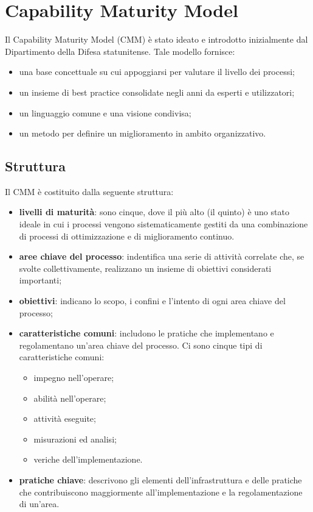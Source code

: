 \documentclass[PianoDiQualifica.tex]{subfiles}
\begin{document}
\section{Capability Maturity Model}
	Il Capability Maturity Model (CMM) è stato ideato e introdotto inizialmente dal Dipartimento della Difesa statunitense. Tale modello
	fornisce:
	\begin{itemize}
		\item una base concettuale su cui appoggiarsi per valutare il livello dei processi;
		\item un insieme di best practice consolidate negli anni da esperti e utilizzatori;
		\item un linguaggio comune e una visione condivisa;
		\item un metodo per definire un miglioramento in ambito organizzativo.
	\end{itemize}
	\subsection{Struttura}
	Il CMM è costituito dalla seguente struttura:
	\begin{itemize}
		\item \textbf{livelli di maturità}: sono cinque, dove il più alto (il quinto) è uno stato ideale in cui i processi vengono sistematicamente
		gestiti da una combinazione di processi di ottimizzazione e di miglioramento continuo. 
		\item \textbf{aree chiave del processo}: indentifica una serie di attività correlate che, se svolte collettivamente,
		realizzano un insieme di obiettivi considerati importanti;
		\item \textbf{obiettivi}: indicano lo scopo, i confini e l'intento di ogni area chiave del processo;
		\item \textbf{caratteristiche comuni}: includono le pratiche che implementano e regolamentano un'area chiave del processo. Ci sono cinque
		tipi di caratteristiche comuni:
		\begin{itemize}
			\item impegno nell'operare;
			\item abilità nell'operare;
			\item attività eseguite;
			\item misurazioni ed analisi;
			\item veriche dell'implementazione.
		\end{itemize}
		\item \textbf{pratiche chiave}: descrivono gli elementi dell'infrastruttura e delle pratiche che contribuiscono maggiormente all'implementazione
		e la regolamentazione di un'area.
	\end{itemize}
	
\end{document}
